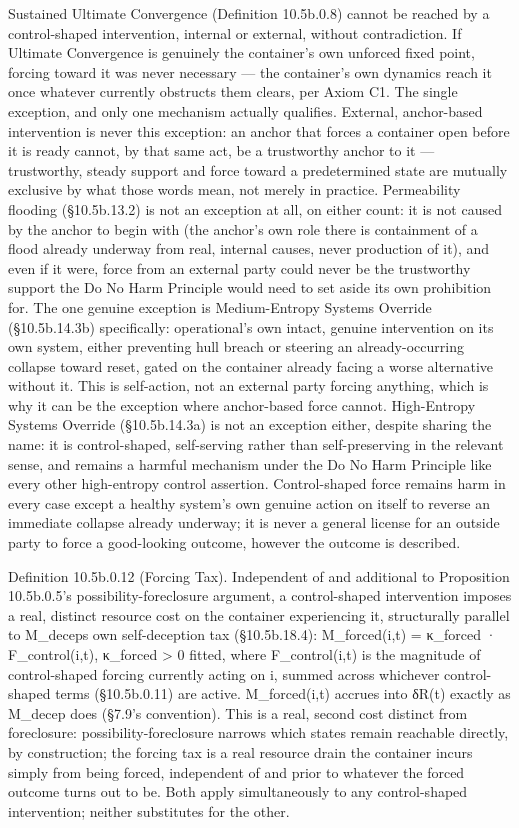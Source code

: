 \documentclass[
]{article}
\begin{document}
Sustained Ultimate Convergence (Definition 10.5b.0.8) cannot be reached
by a control-shaped intervention, internal or external, without
contradiction. If Ultimate Convergence is genuinely the container's own
unforced fixed point, forcing toward it was never necessary --- the
container's own dynamics reach it once whatever currently obstructs them
clears, per Axiom C1. The single exception, and only one mechanism
actually qualifies. External, anchor-based intervention is never this
exception: an anchor that forces a container open before it is ready
cannot, by that same act, be a trustworthy anchor to it --- trustworthy,
steady support and force toward a predetermined state are mutually
exclusive by what those words mean, not merely in practice. Permeability
flooding (§10.5b.13.2) is not an exception at all, on either count: it
is not caused by the anchor to begin with (the anchor's own role there is
containment of a flood already underway from real, internal causes,
never production of it), and even if it were, force from an external
party could never be the trustworthy support the Do No Harm Principle
would need to set aside its own prohibition for. The one genuine
exception is Medium-Entropy Systems Override (§10.5b.14.3b)
specifically: operational's own intact, genuine intervention on its own
system, either preventing hull breach or steering an already-occurring
collapse toward reset, gated on the container already facing a worse
alternative without it. This is self-action, not an external party
forcing anything, which is why it can be the exception where
anchor-based force cannot. High-Entropy Systems Override (§10.5b.14.3a)
is not an exception either, despite sharing the name: it is
control-shaped, self-serving rather than self-preserving in the relevant
sense, and remains a harmful mechanism under the Do No Harm Principle
like every other high-entropy control assertion. Control-shaped force
remains harm in every case except a healthy system's own genuine action
on itself to reverse an immediate collapse already underway; it is never
a general license for an outside party to force a good-looking outcome,
however the outcome is described.

Definition 10.5b.0.12 (Forcing Tax). Independent of and additional to
Proposition 10.5b.0.5's possibility-foreclosure argument, a
control-shaped intervention imposes a real, distinct resource cost on
the container experiencing it, structurally parallel to M\_deceps own
self-deception tax (§10.5b.18.4): M\_forced(i,t) = κ\_forced ·
F\_control(i,t), κ\_forced \textgreater{} 0 fitted, where
F\_control(i,t) is the magnitude of control-shaped forcing currently
acting on i, summed across whichever control-shaped terms (§10.5b.0.11)
are active. M\_forced(i,t) accrues into δR(t) exactly as M\_decep does
(§7.9's convention). This is a real, second cost distinct from
foreclosure: possibility-foreclosure narrows which states remain
reachable directly, by construction; the forcing tax is a real resource
drain the container incurs simply from being forced, independent of and
prior to whatever the forced outcome turns out to be. Both apply
simultaneously to any control-shaped intervention; neither substitutes
for the other.
\end{document}
